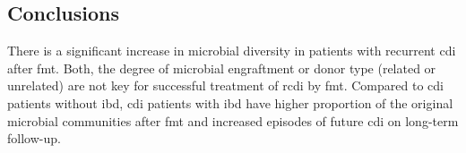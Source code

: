 \subsection{Conclusions}

There is a significant increase in microbial diversity in patients with recurrent \gls{cdi} after \gls{fmt}. Both, the degree of microbial engraftment or donor type (related or unrelated) are not key for successful treatment of \gls{rcdi} by \gls{fmt}. Compared to \gls{cdi} patients without \gls{ibd}, \gls{cdi} patients with \gls{ibd} have higher proportion of the original microbial communities after \gls{fmt} and increased episodes of future \gls{cdi} on long-term follow-up.
